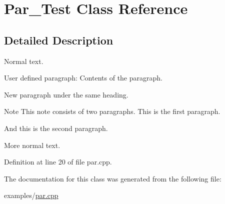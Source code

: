 \hypertarget{class_par___test}{}\section{Par\+\_\+\+Test Class Reference}
\label{class_par___test}


\subsection{Detailed Description}
Normal text.

\begin{DoxyParagraph}{User defined paragraph\+:}
Contents of the paragraph.
\end{DoxyParagraph}
\begin{DoxyParagraph}{}
New paragraph under the same heading.
\end{DoxyParagraph}
\begin{DoxyNote}{Note}
This note consists of two paragraphs. This is the first paragraph.
\end{DoxyNote}
\begin{DoxyParagraph}{}
And this is the second paragraph.
\end{DoxyParagraph}
More normal text. 

Definition at line 20 of file par.\+cpp.



The documentation for this class was generated from the following file\+:\begin{DoxyCompactItemize}
\item 
examples/\mbox{\hyperlink{par_8cpp}{par.\+cpp}}\end{DoxyCompactItemize}
